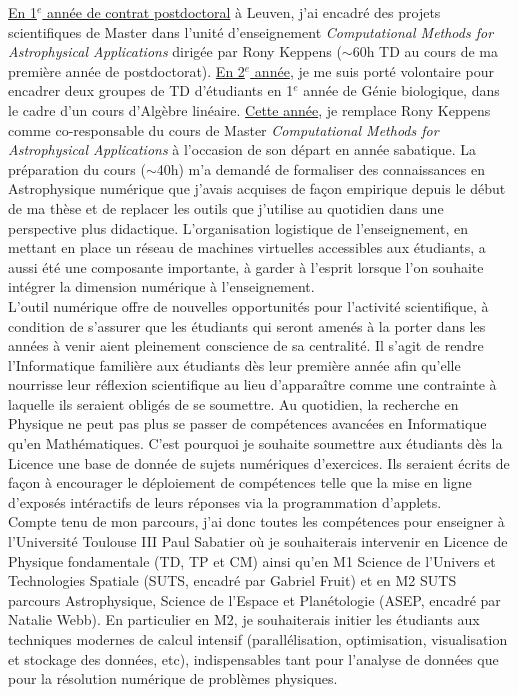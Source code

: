 \documentclass[11pt,onecolumn]{article}
\begin{document}
\indent \underline{En 1$^{e}$ année de contrat postdoctoral} à Leuven, j'ai encadr\'e des projets scientifiques de Master dans l'unit\'e d'enseignement \textit{Computational Methods for Astrophysical Applications} dirig\'ee par Rony Keppens ($\sim$60h TD au cours de ma premi\`ere ann\'ee de postdoctorat). \underline{En 2$^{e}$ année}, je me suis porté volontaire pour encadrer deux groupes de TD d'étudiants en 1$^{e}$ année de Génie biologique, dans le cadre d'un cours d'Algèbre linéaire. \underline{Cette année}, je remplace Rony Keppens comme co-responsable du cours de Master \textit{Computational Methods for Astrophysical Applications} à l'occasion de son départ en année sabatique. La préparation du cours ($\sim$40h) m'a demandé de formaliser des connaissances en Astrophysique numérique que j'avais acquises de fa\c con empirique depuis le début de ma thèse et de replacer les outils que j'utilise au quotidien dans une perspective plus didactique. L'organisation logistique de l'enseignement, en mettant en place un r\'eseau de machines virtuelles accessibles aux \'etudiants, a aussi \'et\'e une composante importante, \`a garder \`a l'esprit lorsque l'on souhaite int\'egrer la dimension num\'erique \`a l'enseignement.\\
\indent L'outil num\'erique offre de nouvelles opportunit\'es pour l'activit\'e scientifique, \`a condition de s'assurer que les \'etudiants qui seront amen\'es \`a la porter dans les ann\'ees \`a venir aient pleinement conscience de sa centralit\'e. Il s'agit de rendre l'Informatique famili\`ere aux \'etudiants d\`es leur premi\`ere ann\'ee afin qu'elle nourrisse leur r\'eflexion scientifique au lieu d'appara\^itre comme une contrainte \`a laquelle ils seraient oblig\'es de se soumettre. Au quotidien, la recherche en Physique ne peut pas plus se passer de comp\'etences avanc\'ees en Informatique qu'en Math\'ematiques. C'est pourquoi je souhaite soumettre aux \'etudiants d\`{e}s la Licence une base de donn\'ee de sujets num\'eriques d'exercices. Ils seraient \'ecrits de fa\c con \`a encourager le d\'eploiement de comp\'etences telle que la mise en ligne d'expos\'es int\'eractifs de leurs r\'eponses via la programmation d'applets.\\
\indent Compte tenu de mon parcours, j'ai donc toutes les comp\'{e}tences pour enseigner à l'Universit\'{e} Toulouse III Paul Sabatier o\`{u} je souhaiterais intervenir en Licence de Physique fondamentale (TD, TP et CM) ainsi qu'en M1 Science de l'Univers et Technologies Spatiale (SUTS, encadr\'{e} par Gabriel Fruit) et en M2 SUTS parcours Astrophysique, Science de l'Espace et Plan\'{e}tologie (ASEP, encadr\'{e} par Natalie Webb). En particulier en M2, je souhaiterais initier les \'etudiants aux techniques modernes de calcul intensif (parall\'elisation, optimisation, visualisation et stockage des donn\'ees, etc), indispensables tant pour l'analyse de donn\'ees que pour la r\'esolution num\'erique de probl\`emes physiques. 
\end{document}
